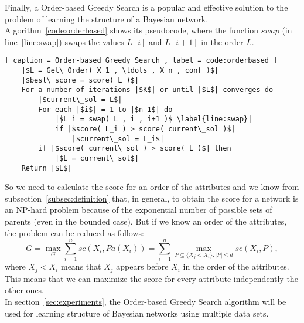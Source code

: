 Finally, a Order-based Greedy Search is a popular and effective solution to the problem of learning the structure of a Bayesian network. Algorithm~\ref{code:orderbased} shows its pseudocode, where the function ${swap}$ (in line~\ref{line:swap}) swaps the values $L[ i ]$ and $L[ i + 1 ]$ in the order $L$.

\begin{lstlisting}[ caption = Order-based Greedy Search , label = code:orderbased ]
	|$L = Get\_Order( X_1 , \ldots , X_n , conf )$|
	|$best\_score = score( L )$|
	For a number of iterations |$K$| or until |$L$| converges do
		|$current\_sol = L$|
		For each |$i$| = 1 to |$n-1$| do
			|$L_i = swap( L , i , i+1 )$ \label{line:swap}|
			if |$score( L_i ) > score( current\_sol )$|
				|$current\_sol = L_i$|
		if |$score( current\_sol ) > score( L )$| then
			|$L = current\_sol$|
	Return |$L$|
\end{lstlisting}
So we need to calculate the score for an order of the attributes and we know from subsection~\ref{subsec:definition} that, in general, to obtain the score for a network is an NP-hard problem because of the exponential number of possible sets of parents (even in the bounded case). But if we know an order of the attributes, the problem can be reduced as follows:
	\[ G = \max_G \sum_{i=1}^{n} {sc}( X_i , {Pa}( X_i ) ) = \sum_{i=1}^{n} \max_{P \subseteq \{ X_j < X_i \}:|P|\leq d} {sc}( X_i , P ) ,\]
where $X_j < X_i$ means that $X_j$ appears before $X_i$ in the order of the attributes. This means that we can maximize the score for every attribute independently the other ones.\\
In section~\ref{sec:experiments}, the Order-based Greedy Search algorithm will be used for learning structure of Bayesian networks using multiple data sets.